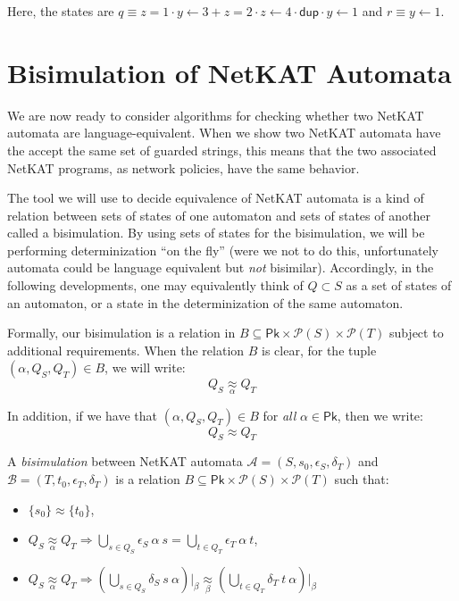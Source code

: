\documentclass[acmsmall,dvipsnames,nonacm]{acmart}
\newcommand\Pk{\mathsf{Pk}}
\newcommand\pk{\alpha}
\newcommand\pkp{\beta}
\newcommand\dup{\mathsf{dup}}
\newcommand\NetKAT{\textsf{NetKAT}\xspace}
\newcommand{\approxp}[1]{\underset{#1}\approx}
\begin{document}
Here, the states are $q \equiv z=1\cdot y\gets3 +  z=2\cdot
z\gets4\cdot\dup\cdot y\gets1$ and $r \equiv y\gets 1$. 



\section{Bisimulation of \NetKAT Automata}

We are now ready to consider algorithms for checking whether two \NetKAT
automata are language-equivalent. When we show two \NetKAT automata have the accept the
same set of guarded strings, this means that the two associated \NetKAT
programs, as network policies, have the same behavior.

The tool we will use to decide equivalence of \NetKAT automata is a
kind of relation between sets of states of one automaton and sets of states of
another called a bisimulation. By using sets of states for the bisimulation, we
will be performing determinization ``on the fly'' (were we not to do this,
unfortunately automata could be language equivalent but \emph{not} bisimilar).
Accordingly, in the following developments, one may equivalently think of
$Q\subset S$ as a set of states of an automaton, or a state in the
determinization of the same automaton.

Formally, our bisimulation is a relation in $B \subseteq \Pk \times
\mathcal{P}(S) \times \mathcal{P}(T)$ subject to additional requirements.
When the relation $B$ is clear, for the tuple $(\pk, Q_S, Q_T) \in B$, we will
write:
\[ Q_S \approxp{\pk} Q_T \]

In addition, if we have that $(\pk, Q_S, Q_T)\in B$ for \emph{all} $\pk\in \Pk$,
then we write:
\[ Q_S \approx Q_T \]

\begin{definition}[Bisimulation]
    A \emph{bisimulation} between \NetKAT automata $\mathcal{A} = (S, s_0, \epsilon_S, \delta_T)$
    and $\mathcal{B} = (T, t_0, \epsilon_T, \delta_T)$ is a relation $B
    \subseteq \Pk \times \mathcal{P}(S) \times \mathcal{P}(T)$ such that:
\begin{itemize}[(a)]
    \item $\{s_0\} \approx \{t_0\}$,
    \item $Q_S \approxp{\pk} Q_T \Rightarrow \bigcup_{s\in Q_S} \epsilon_S~\pk~s
                                         = \bigcup_{t\in Q_T} \epsilon_T~\pk~t$,
    \item $Q_S \approxp{\pk} Q_T \Rightarrow
      (\bigcup_{s\in Q_S} \delta_S\ s\ \pk)\vert_{\pkp} \approxp{\pkp}
      (\bigcup_{t\in Q_T} \delta_T\ t\ \pk)\vert_{\pkp}$
\end{itemize}
\end{definition}
\end{document}
